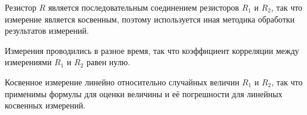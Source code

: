 \documentclass[12pt,a4paper]{article}
\begin{document}
Резистор $R$ является последовательным соединением резисторов $R_1$ и $R_2$, так что измерение
является косвенным, поэтому используется иная методика обработки результатов измерений.
 
Измерения проводились в разное время, так что коэффициент корреляции между измерениями 
$R_1$ и $R_2$ равен нулю.

Косвенное измерение линейно относительно случайных величин $R_1$ и $R_2$, так что
применимы формулы для оценки величины и её погрешности для линейных косвенных измерений.

\end{document}
